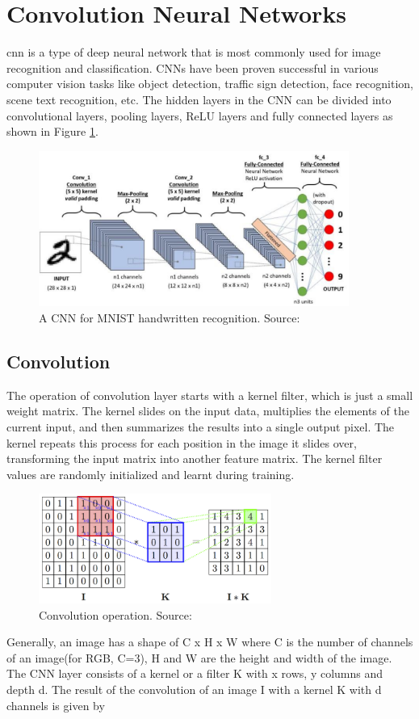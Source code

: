 \section{Convolution Neural Networks}
\gls{cnn} is a type of deep neural network that is most commonly used for image recognition and classification. CNNs have been proven successful in various computer vision tasks like object detection, traffic sign detection, face recognition, scene text recognition, etc. The hidden layers \citep{Goodfellow-et-al-2016} in the CNN can be divided into convolutional layers, pooling layers, ReLU layers and fully connected layers as shown in Figure \ref{fig:cnn}.
\newline
\begin{figure}[H]
\centering
\includegraphics[width=4in,scale=1]{images/CNN.eps}
\caption[A CNN for MNIST handwritten recognition]{A CNN for MNIST handwritten recognition. Source: \citep{cnn}}
\label{fig:cnn}
\end{figure}

\subsection*{Convolution}

The operation of convolution layer starts with a kernel filter, which is just a small weight matrix. The kernel slides on the input data, multiplies the elements of the current input, and then summarizes the results into a single output pixel. The kernel repeats this process for each position in the image it slides over, transforming the input matrix into another feature matrix. The kernel filter values are randomly initialized and learnt during training.
\newline	
\begin{figure}[H]
\centering
\includegraphics[width=3in,scale=.75]{images/convolution.png}
\caption[Convolution operation]{Convolution operation. Source: \citep{convolution}}
\label{fig:convolution}
\end{figure}
Generally, an image has a shape of C x H x W where C is the number of channels of an image(for RGB, C=3), H and W are the height and width of the image. The CNN layer consists of a kernel or a filter K with x rows, y columns and depth d. The result of the convolution \citep{cnneqn} of an image I with a kernel K with d channels is given by

